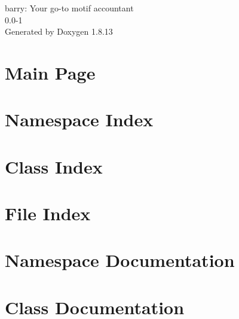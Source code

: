 \documentclass[twoside]{book}
\newcommand{\+}{\discretionary{\mbox{\scriptsize$\hookleftarrow$}}{}{}}
\newcommand{\clearemptydoublepage}{%
  \newpage{\pagestyle{empty}\cleardoublepage}%
}
\begin{document}
\hypersetup{pageanchor=false,
             bookmarksnumbered=true,
             pdfencoding=unicode
            }
\begin{titlepage}
\vspace*{7cm}
\begin{center}%
{\Large barry\+: Your go-\/to motif accountant \\[1ex]\large 0.\+0-\/1 }\\
\vspace*{1cm}
{\large Generated by Doxygen 1.8.13}\\
\end{center}
\end{titlepage}
\clearemptydoublepage
{}
\tableofcontents
\clearemptydoublepage
{}
\hypersetup{pageanchor=true}

\chapter{Main Page}
\label{index}\hypertarget{index}{}
\chapter{Namespace Index}

\chapter{Class Index}

\chapter{File Index}

\chapter{Namespace Documentation}








\chapter{Class Documentation}






























\end{document}
